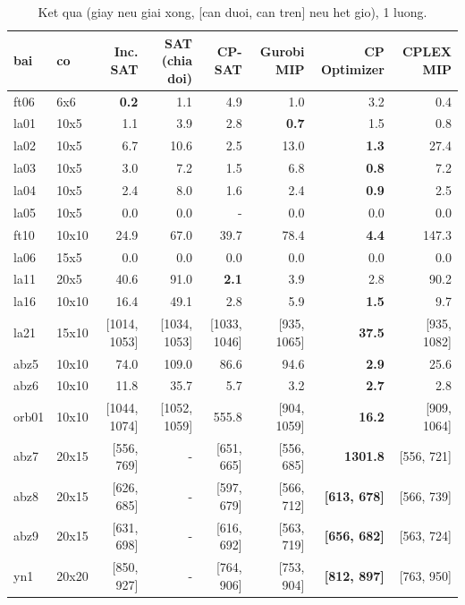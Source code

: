 \begin{table}[t]
\centering
\small
\begin{tabular}{llrrrrrr}
\toprule
bai & co & Inc. SAT & SAT (chia doi) & CP-SAT & Gurobi MIP & CP Optimizer & CPLEX MIP \\
\midrule
ft06 & 6x6 & \textbf{0.2} & 1.1 & 4.9 & 1.0 & 3.2 & 0.4 \\
la01 & 10x5 & 1.1 & 3.9 & 2.8 & \textbf{0.7} & 1.5 & 0.8 \\
la02 & 10x5 & 6.7 & 10.6 & 2.5 & 13.0 & \textbf{1.3} & 27.4 \\
la03 & 10x5 & 3.0 & 7.2 & 1.5 & 6.8 & \textbf{0.8} & 7.2 \\
la04 & 10x5 & 2.4 & 8.0 & 1.6 & 2.4 & \textbf{0.9} & 2.5 \\
la05 & 10x5 & 0.0 & 0.0 & - & 0.0 & 0.0 & 0.0 \\
ft10 & 10x10 & 24.9 & 67.0 & 39.7 & 78.4 & \textbf{4.4} & 147.3 \\
la06 & 15x5 & 0.0 & 0.0 & 0.0 & 0.0 & 0.0 & 0.0 \\
la11 & 20x5 & 40.6 & 91.0 & \textbf{2.1} & 3.9 & 2.8 & 90.2 \\
la16 & 10x10 & 16.4 & 49.1 & 2.8 & 5.9 & \textbf{1.5} & 9.7 \\
la21 & 15x10 & {[}1014, 1053{]} & {[}1034, 1053{]} & {[}1033, 1046{]} & {[}935, 1065{]} & \textbf{37.5} & {[}935, 1082{]} \\
abz5 & 10x10 & 74.0 & 109.0 & 86.6 & 94.6 & \textbf{2.9} & 25.6 \\
abz6 & 10x10 & 11.8 & 35.7 & 5.7 & 3.2 & \textbf{2.7} & 2.8 \\
orb01 & 10x10 & {[}1044, 1074{]} & {[}1052, 1059{]} & 555.8 & {[}904, 1059{]} & \textbf{16.2} & {[}909, 1064{]} \\
abz7 & 20x15 & {[}556, 769{]} & - & {[}651, 665{]} & {[}556, 685{]} & \textbf{1301.8} & {[}556, 721{]} \\
abz8 & 20x15 & {[}626, 685{]} & - & {[}597, 679{]} & {[}566, 712{]} & \textbf{{[}613, 678{]}} & {[}566, 739{]} \\
abz9 & 20x15 & {[}631, 698{]} & - & {[}616, 692{]} & {[}563, 719{]} & \textbf{{[}656, 682{]}} & {[}563, 724{]} \\
yn1 & 20x20 & {[}850, 927{]} & - & {[}764, 906{]} & {[}753, 904{]} & \textbf{{[}812, 897{]}} & {[}763, 950{]} \\
\bottomrule
\end{tabular}
\caption{Ket qua (giay neu giai xong, [can duoi, can tren] neu het gio), 1 luong.}
\label{tab:main}
\end{table}
